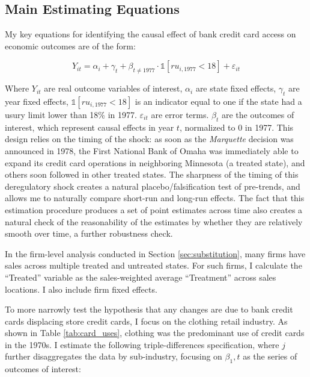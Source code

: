 \documentclass[12pt,english]{article}
\begin{document}
\subsection{Main Estimating Equations}

My key equations for identifying the causal effect of bank credit card access on economic outcomes are of the form: 

\begin{equation}\label{eq:dif_dif}
Y_{it}= \alpha_i + \gamma_t + \beta_{t\ne 1977} \cdot \mathbb{1} \left[ ru_{i,1977} < 18 \right] +  \varepsilon_{it}
\end{equation}

Where $Y_{it}$ are real outcome variables of interest, $\alpha_i$ are state fixed effects, $\gamma_t$ are year fixed effects, $\mathbb{1} \left[ ru_{i,1977} < 18 \right]$ is an indicator equal to one if the state had a usury limit lower than 18\% in 1977. $\varepsilon_{it}$ are error terms. $\beta_{t}$ are the outcomes of interest, which represent causal effects in year $t$, normalized to 0 in 1977. This design relies on the timing of the shock: as soon as the \emph{Marquette} decision was announced in 1978, the First National Bank of Omaha was immediately able to expand its credit card operations in neighboring Minnesota (a treated state), and others soon followed in other treated states. The sharpness of the timing of this deregulatory shock creates a natural placebo/falsification test of pre-trends, and allows me to naturally compare short-run and long-run effects. The fact that this estimation procedure produces a set of point estimates across time also creates a natural check of the reasonability of the estimates by whether they are relatively smooth over time, a further robustness check. 

In the firm-level analysis conducted in Section \ref{sec:substitution}, many firms have sales across multiple treated and untreated states. For such firms, I calculate the ``Treated'' variable as the sales-weighted average ``Treatment'' across sales locations. I also include firm fixed effects. 

To more narrowly test the hypothesis that any changes are due to bank credit cards displacing store credit cards, I focus on the clothing retail industry. As shown in Table \ref{tab:card_uses}, clothing was the predominant use of credit cards in the 1970s. I estimate the following triple-differences specification, where $j$ further disaggregates the data by sub-industry, focusing on $\beta_1,t$ as the series of outcomes of interest:
\end{document}
